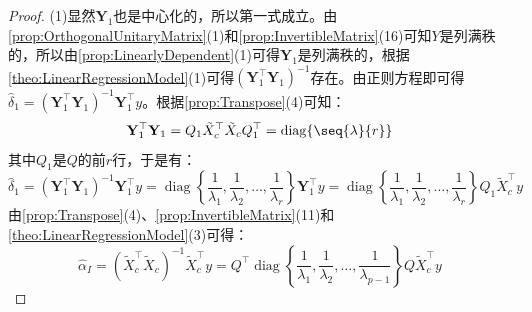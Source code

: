 \begin{proof}
	(1)显然$\mathbf{Y}_1$也是中心化的，所以第一式成立。由\cref{prop:OrthogonalUnitaryMatrix}(1)和\cref{prop:InvertibleMatrix}(16)可知$Y$是列满秩的，所以由\cref{prop:LinearlyDependent}(1)可得$\mathbf{Y}_1$是列满秩的，根据\cref{theo:LinearRegressionModel}(1)可得$(\mathbf{Y}_1^{\top}\mathbf{Y}_1)^{-1}$存在。由正则方程即可得$\hat{\delta}_1=(\mathbf{Y}_1^{\top}\mathbf{Y}_1)^{-1}\mathbf{Y}_1^{\top}y$。根据\cref{prop:Transpose}(4)可知：
	\begin{equation*}
		\mathbf{Y}_1^{\top}\mathbf{Y}_1=Q_1\tilde{X}_c^{\top}\tilde{X}_cQ_1^{\top}=\operatorname{diag}\{\seq{\lambda}{r}\}
	\end{equation*}
	其中$Q_1$是$Q$的前$r$行，于是有：
	\begin{equation*}
		\hat{\delta}_1=(\mathbf{Y}_1^{\top}\mathbf{Y}_1)^{-1}\mathbf{Y}_1^{\top}y=\operatorname{diag}\left\{\dfrac{1}{\lambda_{1}},\dfrac{1}{\lambda_{2}},\dots,\dfrac{1}{\lambda_{r}}\right\}\mathbf{Y}_1^{\top}y=\operatorname{diag}\left\{\dfrac{1}{\lambda_{1}},\dfrac{1}{\lambda_{2}},\dots,\dfrac{1}{\lambda_{r}}\right\}Q_1\tilde{X}_c^{\top}y
	\end{equation*}
	由\cref{prop:Transpose}(4)、\cref{prop:InvertibleMatrix}(11)和\cref{theo:LinearRegressionModel}(3)可得：
	\begin{equation*}
		\hat{\alpha}_I=(\tilde{X}_c^{\top}\tilde{X}_c)^{-1}\tilde{X}_c^{\top}y=Q^{\top}\operatorname{diag}\left\{\dfrac{1}{\lambda_{1}},\dfrac{1}{\lambda_{2}},\dots,\dfrac{1}{\lambda_{p-1}}\right\}Q\tilde{X}_c^{\top}y
	\end{equation*}
\end{proof}